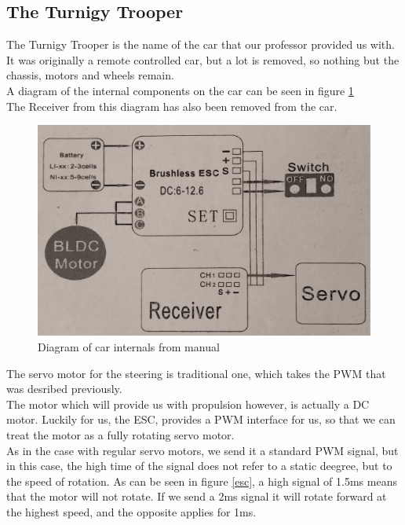 \documentclass{article}
\begin{document}
\subsection{The Turnigy Trooper}
The Turnigy Trooper is the name of the car that our professor provided us with. It was originally a remote controlled car, but a lot is removed, so nothing but the chassis, motors and wheels remain.\\

A diagram of the internal components on the car can be seen in figure \ref{carManual}\\
The Receiver from this diagram has also been removed from the car.

\begin{figure}[H]
  \centering
  \includegraphics[width=0.8\linewidth]{carManual.png}
  \caption{Diagram of car internals from manual}
  \label{carManual}
\end{figure}


The servo motor for the steering is traditional one, which takes the PWM that was desribed previously.\\

The motor which will provide us with propulsion however, is actually a DC motor. Luckily for us, the ESC, provides a PWM interface for us, so that we can treat the motor as a fully rotating servo motor.\\

As in the case with regular servo motors, we send it a standard PWM signal, but in this case, the high time of the signal does not refer to a static deegree, but to the speed of rotation. As can be seen in figure \ref{esc}, a high signal of 1.5ms means that the motor will not rotate. If we send a 2ms signal it will rotate forward at the highest speed, and the opposite applies for 1ms.
\end{document}

